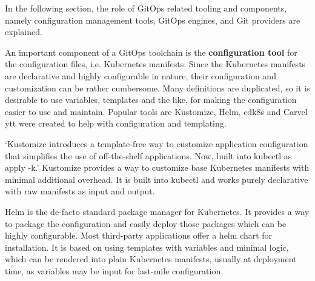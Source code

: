In the following section,
the role of GitOps related tooling and components, namely
configuration management tools,
GitOps engines,
and Git providers
are explained.


An important component of a GitOps toolchain is the \textbf{configuration tool}
for the configuration files, i.e. Kubernetes manifests.
Since the Kubernetes manifests are declarative and highly configurable in nature,
their configuration and customization can be rather cumbersome.
Many definitions are duplicated, so it is desirable to use variables, templates and the like,
for making the configuration easier to use and maintain.
Popular tools are Kustomize, Helm, cdk8s and Carvel ytt were created to help with configuration and templating.

\enquote*{Kustomize introduces a template-free way to customize application configuration that simplifies the use of off-the-shelf applications. Now, built into kubectl as apply -k.}
\autocite{kustomizeIoWebsite}
Kustomize provides a way to customize base Kubernetes manifests with minimal additional overhead.
It is built into kubectl and works purely declarative with raw manifests as input and output.

Helm is the de-facto standard package manager for Kubernetes.
It provides a way to package the configuration and easily deploy those packages
which can be highly configurable.
Most third-party applications offer a helm chart for installation.
It is based on using templates with variables and minimal logic,
which can be rendered into plain Kubernetes manifests, usually at deployment time,
as variables may be input for last-mile configuration.

%










